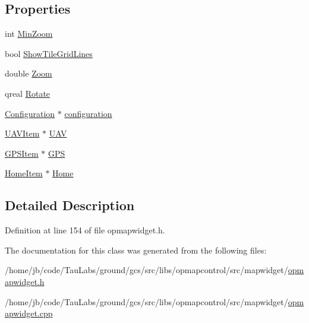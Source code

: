 \subsection*{\-Properties}
\begin{DoxyCompactItemize}
\item 
int \hyperlink{group___o_p_map_widget_gac91f92751a3ac3a5a10a6592d4213d42}{\-Min\-Zoom}
\item 
bool \hyperlink{group___o_p_map_widget_ga41a15a2c8198b2ad76d2b494917a02ed}{\-Show\-Tile\-Grid\-Lines}
\item 
double \hyperlink{group___o_p_map_widget_gadc46820d44c2517e9a6014ddede98099}{\-Zoom}
\item 
qreal \hyperlink{group___o_p_map_widget_gac0960d6e34ea06d84ddad72f930a3917}{\-Rotate}
\item 
\hyperlink{classmapcontrol_1_1_configuration}{\-Configuration} $\ast$ \hyperlink{group___o_p_map_widget_gaa79e123990d6d7b2f1c45e5c2a56313d}{configuration}
\item 
\hyperlink{classmapcontrol_1_1_u_a_v_item}{\-U\-A\-V\-Item} $\ast$ \hyperlink{group___o_p_map_widget_gabb5c6c7e07970a7f9b774ebf94cd2286}{\-U\-A\-V}
\item 
\hyperlink{classmapcontrol_1_1_g_p_s_item}{\-G\-P\-S\-Item} $\ast$ \hyperlink{group___o_p_map_widget_ga83798c623babeffb173d483ad1c84ccc}{\-G\-P\-S}
\item 
\hyperlink{classmapcontrol_1_1_home_item}{\-Home\-Item} $\ast$ \hyperlink{group___o_p_map_widget_ga3c39e182c87b25990664fbe7dd0a9eff}{\-Home}
\end{DoxyCompactItemize}


\subsection{\-Detailed \-Description}


\-Definition at line 154 of file opmapwidget.\-h.



\-The documentation for this class was generated from the following files\-:\begin{DoxyCompactItemize}
\item 
/home/jb/code/\-Tau\-Labs/ground/gcs/src/libs/opmapcontrol/src/mapwidget/\hyperlink{opmapwidget_8h}{opmapwidget.\-h}\item 
/home/jb/code/\-Tau\-Labs/ground/gcs/src/libs/opmapcontrol/src/mapwidget/\hyperlink{opmapwidget_8cpp}{opmapwidget.\-cpp}\end{DoxyCompactItemize}
